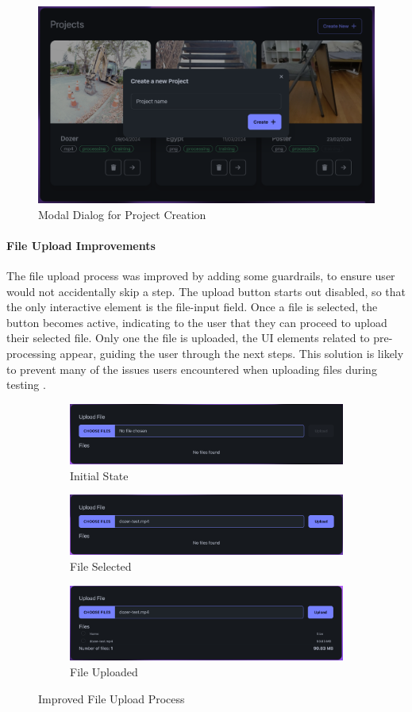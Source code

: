 \begin{figure}[htb]
  \centering
	\includegraphics[width=.65\textwidth]{figures/fix-3.png}
	\caption{Modal Dialog for Project Creation}
  \label{fig:fix-3}
\end{figure}

\paragraph{File Upload Improvements}
The file upload process was improved by adding some guardrails, to ensure user would not accidentally skip a step.
The upload button starts out disabled, so that the only interactive element is the file-input field.
Once a file is selected, the button becomes active, indicating to the user that they can proceed to upload their selected file.
Only one the file is uploaded, the UI elements related to pre-processing appear, guiding the user through the next steps.
This solution is likely to prevent many of the issues users encountered when uploading files during testing .


\begin{figure}[htb]
  \begin{subfigure}{\textwidth}
    \centering
    \includegraphics[width=.65\linewidth]{figures/fix-4.1.png}
    \caption{Initial State}
  \end{subfigure}
  \begin{subfigure}{\textwidth}
    \centering
    \includegraphics[width=.65\linewidth]{figures/fix-4.2.png}
    \caption{File Selected}
  \end{subfigure}
  \begin{subfigure}{\textwidth}
    \centering
    \includegraphics[width=.65\linewidth]{figures/fix-4.3.png}
    \caption{File Uploaded}
  \end{subfigure}
	\caption{Improved File Upload Process}
  \label{fig:fix-4}
\end{figure}
